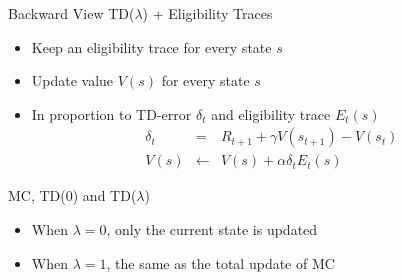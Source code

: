 \documentclass[aspectratio=169]{../latex_main/tntbeamer}  %
\begin{document}
\begin{frame}[c]{Backward View TD($\lambda$) + Eligibility Traces}
	

\begin{itemize}
	\item Keep an eligibility trace for every state $s$
	\item Update value $V(s)$ for every state $s$
	\item In proportion to TD-error $\delta_t$ and eligibility trace $E_t(s)$
	\begin{eqnarray}
	\delta_t &=& R_{t+1} + \gamma V(s_{t+1}) - V(s_t)\nonumber\\
	V(s) &\gets& V(s) + \alpha \delta_t E_t(s)\nonumber
	\end{eqnarray}
\end{itemize}

\end{frame}
\begin{frame}[c]{MC, TD(0) and TD($\lambda$)}
	
	
	\begin{itemize}
		\item When $\lambda = 0$, only the current state is updated
		\item When $\lambda = 1$, the same as the total update of MC
	\end{itemize}
	
\end{frame}

\end{document}
